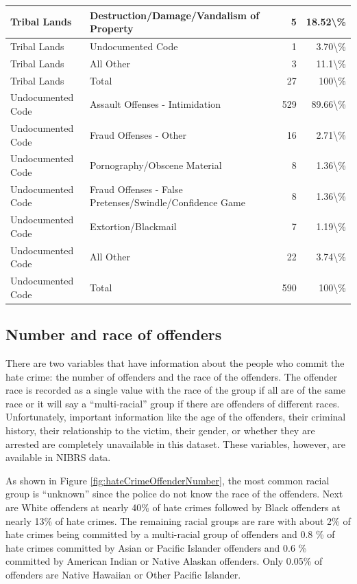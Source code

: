 \documentclass[
]{krantz}
\begin{document}
\begin{longtable}[t]{l|l|r|r}
\hline
Tribal Lands & Destruction/Damage/Vandalism of Property & 5 & 18.52\textbackslash{}\%\\
\hline
Tribal Lands & Undocumented Code & 1 & 3.70\textbackslash{}\%\\
\hline
Tribal Lands & All Other & 3 & 11.1\textbackslash{}\%\\
\hline
Tribal Lands & Total & 27 & 100\textbackslash{}\%\\
\hline
Undocumented Code & Assault Offenses - Intimidation & 529 & 89.66\textbackslash{}\%\\
\hline
Undocumented Code & Fraud Offenses - Other & 16 & 2.71\textbackslash{}\%\\
\hline
Undocumented Code & Pornography/Obscene Material & 8 & 1.36\textbackslash{}\%\\
\hline
Undocumented Code & Fraud Offenses - False Pretenses/Swindle/Confidence Game & 8 & 1.36\textbackslash{}\%\\
\hline
Undocumented Code & Extortion/Blackmail & 7 & 1.19\textbackslash{}\%\\
\hline
Undocumented Code & All Other & 22 & 3.74\textbackslash{}\%\\
\hline
Undocumented Code & Total & 590 & 100\textbackslash{}\%\\
\hline
\end{longtable}

\subsection{Number and race of
offenders}\label{number-and-race-of-offenders}

There are two variables that have information about the
people who commit the hate crime: the number of offenders
and the race of the offenders. The offender race is recorded
as a single value with the race of the group if all are of
the same race or it will say a ``multi-racial'' group if
there are offenders of different races. Unfortunately,
important information like the age of the offenders, their
criminal history, their relationship to the victim, their
gender, or whether they are arrested are completely
unavailable in this dataset. These variables, however, are
available in NIBRS data.

As shown in Figure \ref{fig:hateCrimeOffenderNumber}, the
most common racial group is ``unknown'' since the police do
not know the race of the offenders. Next are White offenders
at nearly 40\% of hate crimes followed by Black offenders at
nearly 13\% of hate crimes. The remaining racial groups are
rare with about 2\% of hate crimes being committed by a
multi-racial group of offenders and 0.8 \% of hate crimes
committed by Asian or Pacific Islander offenders and 0.6 \%
committed by American Indian or Native Alaskan offenders.
Only 0.05\% of offenders are Native Hawaiian or Other
Pacific Islander.
\end{document}
